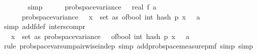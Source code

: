 \begin{isabellebody}
\ \ \ \ \ \ \isamarkupfalse%
\ simp\isanewline
\isanewline
\ \ \ \ \isamarkupfalse%
\ {\isachardoublequoteopen}prob{\isacharunderscore}{\kern0pt}space{\isachardot}{\kern0pt}variance\ {\isasymOmega}\ {\isacharparenleft}{\kern0pt}{\isasymlambda}{\isasymomega}{\isachardot}{\kern0pt}\ real\ {\isacharparenleft}{\kern0pt}f\ a\ {\isasymomega}{\isacharparenright}{\kern0pt}{\isacharparenright}{\kern0pt}\ {\isacharequal}{\kern0pt}\ \isanewline
\ \ \ \ \ \ prob{\isacharunderscore}{\kern0pt}space{\isachardot}{\kern0pt}variance\ {\isasymOmega}\ {\isacharparenleft}{\kern0pt}{\isasymlambda}{\isasymomega}{\isachardot}{\kern0pt}\ {\isacharparenleft}{\kern0pt}{\isasymSum}x\ {\isasymin}\ set\ as{\isachardot}{\kern0pt}\ of{\isacharunderscore}{\kern0pt}bool\ {\isacharparenleft}{\kern0pt}int\ {\isacharparenleft}{\kern0pt}hash\ p\ x\ {\isasymomega}{\isacharparenright}{\kern0pt}\ {\isasymle}\ a{\isacharparenright}{\kern0pt}{\isacharparenright}{\kern0pt}{\isacharparenright}{\kern0pt}{\isachardoublequoteclose}\isanewline
\ \ \ \ \ \ \isamarkupfalse%
\ {\isacharparenleft}{\kern0pt}simp\ add{\isacharcolon}{\kern0pt}f{\isacharunderscore}{\kern0pt}def\ inters{\isacharunderscore}{\kern0pt}compr{\isacharparenright}{\kern0pt}\isanewline
\ \ \ \ \isamarkupfalse%
\ \isamarkupfalse%
\ {\isachardoublequoteopen}{\isachardot}{\kern0pt}{\isachardot}{\kern0pt}{\isachardot}{\kern0pt}\ {\isacharequal}{\kern0pt}\ {\isacharparenleft}{\kern0pt}{\isasymSum}x\ {\isasymin}\ set\ as{\isachardot}{\kern0pt}\ prob{\isacharunderscore}{\kern0pt}space{\isachardot}{\kern0pt}variance\ {\isasymOmega}\ {\isacharparenleft}{\kern0pt}{\isasymlambda}{\isasymomega}{\isachardot}{\kern0pt}\ of{\isacharunderscore}{\kern0pt}bool\ {\isacharparenleft}{\kern0pt}int\ {\isacharparenleft}{\kern0pt}hash\ p\ x\ {\isasymomega}{\isacharparenright}{\kern0pt}\ {\isasymle}\ a{\isacharparenright}{\kern0pt}{\isacharparenright}{\kern0pt}{\isacharparenright}{\kern0pt}{\isachardoublequoteclose}\isanewline
\ \ \ \ \ \ \isamarkupfalse%
\ {\isacharparenleft}{\kern0pt}rule\ prob{\isacharunderscore}{\kern0pt}space{\isachardot}{\kern0pt}var{\isacharunderscore}{\kern0pt}sum{\isacharunderscore}{\kern0pt}pairwise{\isacharunderscore}{\kern0pt}indep{\isacharunderscore}{\kern0pt}{}{\isacharcomma}{\kern0pt}\ simp\ add{\isacharcolon}{\kern0pt}prob{\isacharunderscore}{\kern0pt}space{\isacharunderscore}{\kern0pt}measure{\isacharunderscore}{\kern0pt}pmf{\isacharcomma}{\kern0pt}\ simp{\isacharcomma}{\kern0pt}\ simp{\isacharparenright}{\kern0pt}\isanewline

\end{isabellebody}
